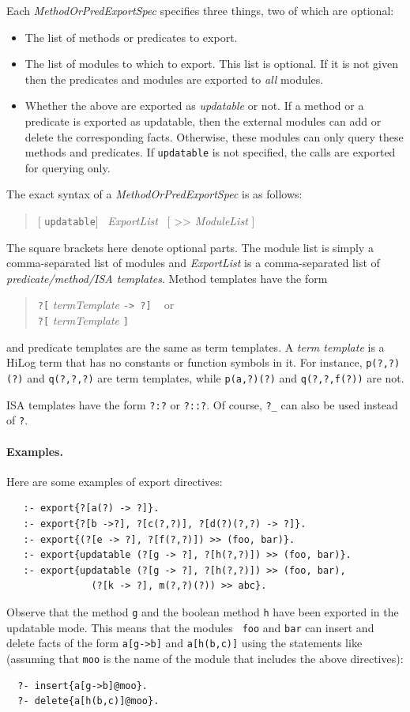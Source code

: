 \documentclass[11pt]{article}
\begin{document}
Each \emph{MethodOrPredExportSpec} specifies three things, two of which are
optional:
\begin{itemize}
  \item  The list of methods or predicates to export.
  \item  The list of modules to which to export.
     This list is optional. If it is not given then the predicates
     and modules are exported to \emph{all} modules.
   \item  Whether the above are exported as \emph{updatable} or not. 
     If a method or a predicate is exported as updatable, then the external
     modules can add or delete the corresponding facts. Otherwise, these
     modules can only query these methods and predicates.
     If {\tt updatable} is not specified, the calls are exported for
     querying only.
\end{itemize}
The exact syntax of a \emph{MethodOrPredExportSpec} is as follows:
\begin{quote}
    [ {\tt updatable}]~ \emph{ExportList}~ [ \textnormal{>{}>} \emph{ModuleList} ]
\end{quote}
The square brackets here denote optional parts. The module list is simply a
comma-separated list of modules and \emph{ExportList} is a comma-separated
list of \emph{predicate/method/ISA templates}. Method templates have the form
\begin{quote}
   {\tt ?[} \emph{termTemplate} {\tt -> ?]} ~ or\\
   {\tt ?[} \emph{termTemplate} {\tt]}\\
\end{quote}
and predicate templates are the same as term templates. A \emph{term
  template} is a HiLog term that has no constants or function symbols in
it. For instance, {\tt p(?,?)(?)} and {\tt q(?,?,?)} are term templates,
while {\tt p(a,?)(?)} and {\tt q(?,?,f(?))} are not.

ISA templates have the form  {\tt ?:?} or {\tt ?::?}.   Of course, {\tt ?\_}
can also be used instead of {\tt ?}.

\paragraph{Examples.}
Here are some examples of export directives:
\begin{verbatim}
   :- export{?[a(?) -> ?]}.
   :- export{?[b ->?], ?[c(?,?)], ?[d(?)(?,?) -> ?]}.
   :- export{(?[e -> ?], ?[f(?,?)]) >> (foo, bar)}.
   :- export{updatable (?[g -> ?], ?[h(?,?)]) >> (foo, bar)}.
   :- export{updatable (?[g -> ?], ?[h(?,?)]) >> (foo, bar),
               (?[k -> ?], m(?,?)(?)) >> abc}.
\end{verbatim}
Observe that the method {\tt g} and the boolean method {\tt h}
have been exported in the updatable mode. This means that the modules {\tt
  foo} and {\tt bar} can insert and delete facts of the form 
{\tt a[g->b]} and {\tt a[h(b,c)]} using the statements like
(assuming that {\tt moo} is the name of the module that includes the above
directives): 
\begin{verbatim}
  ?- insert{a[g->b]@moo}.
  ?- delete{a[h(b,c)]@moo}.
\end{verbatim}
\end{document}
